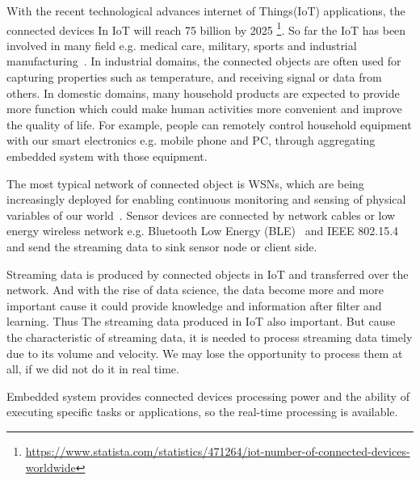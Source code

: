 



With the recent technological advances internet of Things(IoT) applications, the
connected devices In IoT will reach 75 billion by 2025
\footnote{\url{https://www.statista.com/statistics/471264/iot-number-of-connected-devices-worldwide}}. 
So far the IoT has been involved in many field e.g. medical care, military,
sports and industrial manufacturing~\cite{boudargham2017exhaustive,
lai2013survey, da2014internet}. In industrial domains, the connected objects are
often used for capturing properties such as temperature, and receiving signal or
data from others. In domestic domains, many household products are expected to
provide more function which could make human activities more convenient and
improve the quality of life. For example, people can remotely control household
equipment with our smart electronics e.g. mobile phone and PC, through
aggregating embedded system with those equipment. 

The most typical network of connected object is WSNs, which are being
increasingly deployed for enabling continuous monitoring and sensing of physical
variables of our world~\cite{li2016temporal}. Sensor devices are connected by
network cables or low energy wireless network e.g. Bluetooth Low Energy
(BLE)~\cite{bluetoothlowenergy} and IEEE 802.15.4~\cite{IEEE802.15.4} and send
the streaming data to sink sensor node or client side.

Streaming data is produced by connected objects in IoT and transferred over the
network.  And with the rise of data science, the data become more and more
important cause it could provide knowledge and information after filter and
learning. Thus The streaming data produced in IoT also important. But cause the
characteristic of streaming data, it is needed to process streaming data timely
due to its volume and velocity. We may lose the opportunity to process them at
all, if we did not do it in real time.

Embedded system provides connected devices processing power and the ability of
executing specific tasks or applications, so the real-time processing is
available. 

